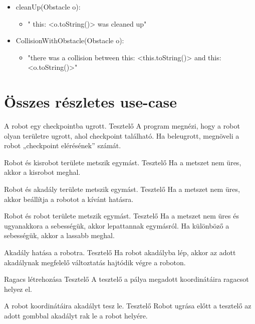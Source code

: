 \begin{itemize}
\begin{itemize}
\begin{itemize}
	        \end{itemize}
	 \item cleanUp(Obstacle o):     
	        \begin{itemize}
	        \item  " this: <o.toString()> was cleaned up"
	        
	        \end{itemize}
\item CollisionWithObstacle(Obstacle o):     
	        \begin{itemize}
	        \item  "there was a collision between this: <this.toString()> and this: <o.toString()>"
	        
	        \end{itemize}
	        
	\end{itemize}
\end{itemize}
\newpage

\section{Összes részletes use-case}

{A robot egy checkpointba ugrott.}
{Tesztelő}
{A program megnézi, hogy a robot olyan területre ugrott, ahol checkpoint található. Ha beleugrott, megnöveli a robot „checkpoint elérésének” számát.}

{Robot és kisrobot területe metszik egymást.}
{Tesztelő}
{Ha a metszet nem üres, akkor a kisrobot meghal.}

{Robot és akadály területe metszik egymást.}
{Tesztelő}
{Ha a metszet nem üres, akkor beállítja a robotot a kívánt hatásra.}

{Robot és robot területe metszik egymást.}
{Tesztelő}
{Ha a metszet nem üres és ugyanakkora a sebességük, akkor lepattannak egymásról. Ha különböző a sebességük, akkor a lassabb meghal.
}

{Akadály hatása a robotra.}
{Tesztelő}
{Ha robot akadályba lép, akkor az adott akadálynak megfelelő változtatás hajtódik végre a roboton.}
\newpage

{Ragacs létrehozása}
{Tesztelő}
{A tesztelő a pálya megadott koordinátáira ragacsot helyez el.}

{A robot koordinátáira akadályt tesz le.}
{Tesztelő}
{Robot ugrása előtt a tesztelő az adott gombbal akadályt rak le a robot helyére.}

